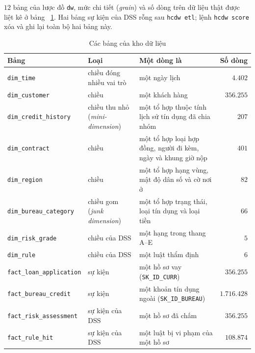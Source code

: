 \medskip

$12$ bảng của lược đồ \texttt{dw}, mức chi tiết (\textit{grain}) và số dòng trên dữ liệu thật được liệt kê ở bảng ~\ref{tab:dw-tables}. Hai bảng sự kiện của DSS rỗng sau \texttt{hcdw etl}; lệnh \texttt{hcdw score} xóa và ghi lại toàn bộ hai bảng này.

\begin{table}[H]
	\centering
	\caption{Các bảng của kho dữ liệu}
	\label{tab:dw-tables}
	\footnotesize
	\begin{tabular}{l p{3.6cm} p{5.6cm} r}
		\toprule
		\textbf{Bảng}                    & \textbf{Loại}                           & \textbf{Một dòng là}                                          & \textbf{Số dòng} \\
		\midrule
		\texttt{dim\_time}               & chiều đóng nhiều vai trò                & một ngày lịch                                                 & $4.402$          \\
		\texttt{dim\_customer}           & chiều                                   & một khách hàng                                                & $356.255$        \\
		\texttt{dim\_credit\_history}    & chiều thu nhỏ (\textit{mini-dimension}) & một tổ hợp thuộc tính lịch sử tín dụng đã chia nhóm           & $207$            \\
		\texttt{dim\_contract}           & chiều                                   & một tổ hợp loại hợp đồng, người đi kèm, ngày và khung giờ nộp & $401$            \\
		\texttt{dim\_region}             & chiều                                   & một tổ hợp hạng vùng, mật độ dân số và cờ nơi ở               & $82$             \\
		\texttt{dim\_bureau\_category}   & chiều gom (\textit{junk dimension})     & một tổ hợp trạng thái, loại tín dụng và loại tiền             & $66$             \\
		\texttt{dim\_risk\_grade}        & chiều của DSS                           & một hạng trong thang A--E                                     & $5$              \\
		\texttt{dim\_rule}               & chiều của DSS                           & một luật thẩm định                                            & $6$              \\
		\midrule
		\texttt{fact\_loan\_application} & sự kiện                                 & một hồ sơ vay (\texttt{SK\_ID\_CURR})                         & $356.255$        \\
		\texttt{fact\_bureau\_credit}    & sự kiện                                 & một khoản tín dụng ngoài (\texttt{SK\_ID\_BUREAU})            & $1.716.428$      \\
		\texttt{fact\_risk\_assessment}  & sự kiện của DSS                         & một hồ sơ đã chấm                                             & $356.255$        \\
		\texttt{fact\_rule\_hit}         & sự kiện của DSS                         & một luật bị vi phạm của một hồ sơ                             & $108.874$        \\
		\bottomrule
	\end{tabular}
\end{table}

